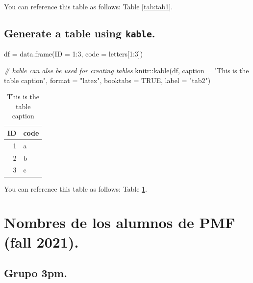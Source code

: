 \documentclass[12pt,halfline,a4paper,]{ouparticle}
\newenvironment{Shaded}{\begin{snugshade}}{\end{snugshade}}
\newcommand{\AttributeTok}[1]{\textcolor[rgb]{0.77,0.63,0.00}{#1}}
\newcommand{\CommentTok}[1]{\textcolor[rgb]{0.56,0.35,0.01}{\textit{#1}}}
\newcommand{\ConstantTok}[1]{\textcolor[rgb]{0.00,0.00,0.00}{#1}}
\newcommand{\DecValTok}[1]{\textcolor[rgb]{0.00,0.00,0.81}{#1}}
\newcommand{\FunctionTok}[1]{\textcolor[rgb]{0.00,0.00,0.00}{#1}}
\newcommand{\NormalTok}[1]{#1}
\newcommand{\OtherTok}[1]{\textcolor[rgb]{0.56,0.35,0.01}{#1}}
\newcommand{\SpecialCharTok}[1]{\textcolor[rgb]{0.00,0.00,0.00}{#1}}
\newcommand{\StringTok}[1]{\textcolor[rgb]{0.31,0.60,0.02}{#1}}
\begin{document}
You can reference this table as follows: Table \ref{tab:tab1}.

\hypertarget{generate-a-table-using-kable.}{%
\subsection{\texorpdfstring{Generate a table using
\texttt{kable}.}{Generate a table using kable.}}\label{generate-a-table-using-kable.}}

\begin{Shaded}
\begin{Highlighting}[]
\NormalTok{df }\OtherTok{=} \FunctionTok{data.frame}\NormalTok{(}\AttributeTok{ID =} \DecValTok{1}\SpecialCharTok{:}\DecValTok{3}\NormalTok{, }\AttributeTok{code =}\NormalTok{ letters[}\DecValTok{1}\SpecialCharTok{:}\DecValTok{3}\NormalTok{])}

\CommentTok{\# kable can alse be used for creating tables}
\NormalTok{knitr}\SpecialCharTok{::}\FunctionTok{kable}\NormalTok{(df, }\AttributeTok{caption =} \StringTok{"This is the table caption"}\NormalTok{, }\AttributeTok{format =} \StringTok{"latex"}\NormalTok{,}
             \AttributeTok{booktabs =} \ConstantTok{TRUE}\NormalTok{, }\AttributeTok{label =} \StringTok{"tab2"}\NormalTok{)}
\end{Highlighting}
\end{Shaded}

\begin{table}

\caption{\label{tab:tab2}This is the table caption}
\centering
\begin{tabular}[t]{rl}
\toprule
ID & code\\
\midrule
1 & a\\
2 & b\\
3 & c\\
\bottomrule
\end{tabular}
\end{table}

You can reference this table as follows: Table \ref{tab:tab2}.

\hypertarget{nombres-de-los-alumnos-de-pmf-fall-2021.}{%
\section{Nombres de los alumnos de PMF (fall
2021).}\label{nombres-de-los-alumnos-de-pmf-fall-2021.}}

\hypertarget{grupo-3pm.}{%
\subsection{Grupo 3pm.}\label{grupo-3pm.}}
\end{document}
